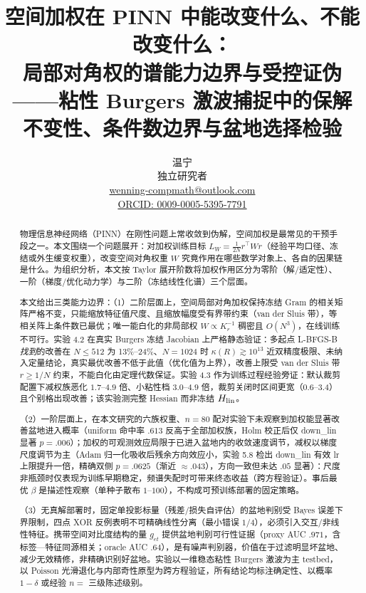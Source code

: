 \documentclass[fontset=windows,11pt]{ctexart}
\title{\textbf{空间加权在 PINN 中能改变什么、不能改变什么：\\局部对角权的谱能力边界与受控证伪}\\[3pt]
\large ——粘性 Burgers 激波捕捉中的保解不变性、条件数边界与盆地选择检验}
\author{温宁\\[2pt]
\small 独立研究者\\[1pt]
\small \href{mailto:wenning-compmath@outlook.com}{wenning-compmath@outlook.com}\\[1pt]
\small \href{https://orcid.org/0009-0005-5395-7791}{ORCID: 0009-0005-5395-7791}}
\date{}
\newcommand{\W}{W}
\numberwithin{equation}{section}
\begin{document}
\maketitle
\begin{abstract}

物理信息神经网络（PINN）在刚性问题上常收敛到伪解，空间加权是最常见的干预手段之一。本文围绕一个问题展开：对加权训练目标 $L_\W=\tfrac{1}{2N} r^\top \W r$（经验平均口径、冻结或外生缓变权重），改变空间对角权重 $\W$ 究竟作用在哪些数学对象上、各自的因果链是什么。为组织分析，本文按 Taylor 展开阶数将加权作用区分为零阶（解/适定性）、一阶（梯度/优化动力学）与二阶（冻结线性化谱）三个层面。

本文给出三类能力边界：（1）二阶层面上，空间局部对角加权保持冻结 Gram 的相关矩阵严格不变，只能缩放特征值尺度、且缩放幅度受有界带约束（van der Sluis 带），等相关阵上条件数已最优；唯一能白化的非局部权 $\W\propto K_r^{-1}$ 稠密且 $O(N^3)$，在线训练不可行。实验 4.2 在真实 Burgers 冻结 Jacobian 上严格静态验证：多起点 L-BFGS-B\emph{找到}的改善在 $N\le512$ 为 13\%--24\%、$N=1024$ 时 $\kappa(R)\gtrsim10^{13}$ 近双精度极限、未纳入定量结论，真实最优改善不低于此值（优化值为上界），改善上限受 van der Sluis 带 $r\ge1/N$ 约束，不能白化由定理代数保证。实验 4.3 作为训练过程经验旁证：默认裁剪配置下减权族恶化 $1.7$--$4.9$ 倍、小粘性档 $3.0$--$4.9$ 倍，裁剪关闭时区间更宽（$0.6$--$3.4$）且个别格出现改善；该实验测完整 Hessian 而非冻结 $H_{\rm lin}$。

（2）一阶层面上，在本文研究的六族权重、$n=80$ 配对实验下未观察到加权能显著改善盆地进入概率（uniform 命中率 $.613$ 反高于全部加权族，Holm 校正后仅 down\_lin 显著 $p=.006$）；加权的可观测效应局限于已进入盆地内的收敛速度调节，减权以梯度尺度调节为主（Adam 归一化吸收后残余方向效应小，实验 5.8 检出 down\_lin 有效 lr 上限提升一倍，精确双侧 $p=.0625$（渐近 $\approx.043$），方向一致但未达 $.05$ 显著）：尺度非瓶颈时仅表现为训练早期稳定，频谱失配时可带来终态收益（跨方程验证）。事后最优 $\beta$ 是描述性观察（单种子散布 $1$--$100$），不构成可预训练部署的固定策略。

（3）无真解部署时，固定单投影标量（残差/损失自评估）的盆地判别受 Bayes 误差下界限制，四点 XOR 反例表明不可精确线性分离（最小错误 $1/4$），必须引入交互/非线性特征。携带空间对比度结构的量 $g_{et}$ 提供盆地判别可行性证据（proxy AUC $.971$，含标签—特征同源相关；oracle AUC $.64$），是有噪声判别器，价值在于过滤明显坏盆地、减少无效精修，非精确识别好盆地。实验以一维稳态粘性 Burgers 激波为主 testbed，以 Poisson 光滑退化与内部奇性原型为跨方程验证，所有结论均标注确定性、以概率 $1-\delta$ 或经验 $n=$ 三级陈述级别。

\end{abstract}
\end{document}
